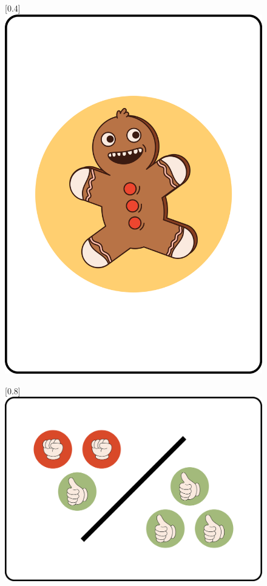 \documentclass[11pt, parskip=half]{scrartcl}
\begin{document}
\begin{figure}[ht]
      [0.4\textwidth]{\includegraphics[scale=0.25]{Images/gingerbread_man_card_display.png}}
      \end{figure}
      
      \vfill
	  \begin{figure}[ht]
	  \centering      
      [0.8\textwidth]{\includegraphics[scale=0.25]{Images/score_card_display.png}}  
      \end{figure}
            
\end{document}
